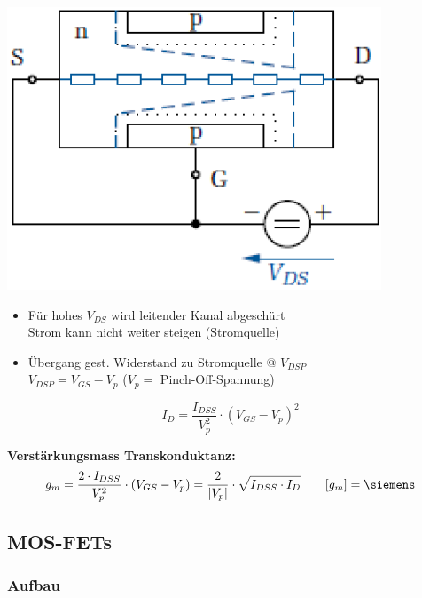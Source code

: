 \begin{minipage}[t]{0.3\columnwidth}
    \includegraphics[align=t, width=\columnwidth]{images/fet_aufbau_saettigung.png}
\end{minipage}
\hfill
\begin{minipage}[t]{0.68\columnwidth}
    \begin{itemize}
        \item Für hohes $V_{DS}$ wird leitender Kanal abgeschürt \\
            \textrightarrow Strom kann nicht weiter steigen (Stromquelle)
        \item Übergang gest. Widerstand zu Stromquelle @ $V_{DSP}$ \\
        \textrightarrow $V_{DSP} = V_{GS} - V_p$ ($V_p =$ Pinch-Off-Spannung)
    \end{itemize}

    $$ I_D = \frac{ I_{DSS}}{V_p^2} \cdot ( V_{GS} - V_p )^2 $$
\end{minipage}

\vspace{0.2cm}
\textbf{Verstärkungsmass Transkonduktanz:}
$$ g_m = \frac{ 2 \cdot I_{DSS}}{V_p^2} \cdot ( V_{GS} - V_p ) = \frac{2}{| V_p |} \cdot \sqrt{I_{DSS} \cdot I_D} \qquad [g_m] = \siemens $$


\subsection{MOS-FETs}

\subsubsection{Aufbau}

